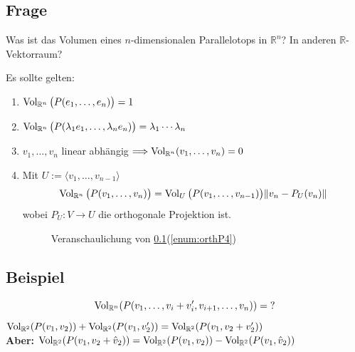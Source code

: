 \subsection[Frage: Was ist das Volumen eines $n$-dimensionalen Prallelotops]{Frage} %
\label{sub:24}
Was ist das Volumen eines $n$-dimensionalen Parallelotops in $\mathds{R}^n$? In anderen $\mathds{R}$-Vektorraum?

Es sollte gelten:
\begin{enumerate}[(1)]
	\item \label{enum:orthP1}$\operatorname{Vol}_{\mathbb{R}^n} \big(P (e_1, \ldots , e_n)\big)= 1$
	\item \label{enum:orthP2} $\operatorname{Vol}_{\mathbb{R}^n} \big(P (\lambda_1 e_1, \ldots , \lambda_n e_n)\big)= \lambda_1  \cdots  \lambda_n$
	\item \label{enum:orthP3}$v_1, \ldots , v_n$ linear abhängig $\Longrightarrow \operatorname{Vol}_{\mathbb{R}^n}(v_1, \ldots , v_n)= 0$
	\item \label{enum:orthP4} Mit $U:= \langle v_1, \ldots , v_{n-1}\rangle$
	\[
		\Vol_{\mathds{R}^n} \big(P (v_1, \dots , v_n)\big) = \Vol_U \big( P(v_1, \ldots , v_{n-1})\big) \norm[]{v_n - P_U (v_n)} 
	\]
	wobei $P_U : V \to U$ die orthogonale Projektion  ist.
	\begin{figure}[h]
		\caption{Veranschaulichung von \ref{sub:24}(\ref{enum:orthP4})}
	\end{figure}
\end{enumerate}

\subsection[Beispiel für Probleme bei der Volumenberechnung]{Beispiel} %
\label{sub:25}
\[
	\operatorname{Vol}_{\mathbb{R}^n} (P(v_1, \ldots , v_i + v_i', v_{i+1} , \ldots , v_n)) =  \text{?}
\]
$\operatorname{Vol}_{\mathbb{R}^2} (P (v_1, v_2)) + \operatorname{Vol}_{\mathbb{R}^2} (P(v_1, v_2')) = \operatorname{Vol}_{\mathbb{R}^2} (P(v_1, v_2+v_2'))   $\\
\textbf{Aber:} $\operatorname{Vol}_{\mathbb{R}^2} ( P(v_1, v_2 + \hat v_2)) = \operatorname{Vol}_{\mathbb{R}^2} (P(v_1, v_2)) - \operatorname{Vol}_{\mathbb{R}^2} (P(v_1, \hat v_2))   $

